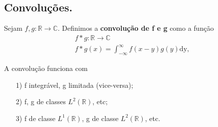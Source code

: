 \documentclass[../pde_notes.tex]{subfiles}
\begin{document}
\subsection{Convoluções.}
\begin{def*}
	Sejam \(f, g:\mathbb{R}\rightarrow \mathbb{C}\). Definimos a \textbf{convolução de f e g} como a função
	\begin{align*}
		 & f * g:  \mathbb{R}\rightarrow \mathbb{C}                  \\
		 & f * g(x) = \int_{-\infty}^{\infty}f(x-y)g(y) \mathrm{dy},
	\end{align*}
\end{def*}
\begin{tcolorbox}[
		skin=enhanced,
		title=Observação,
		fonttitle=\bfseries,
		colframe=black,
		colbacktitle=cyan!75!white,
		colback=cyan!15,
		colbacklower=black,
		coltitle=black,
		drop fuzzy shadow,
	]
	A convolução funciona com
	\begin{itemize}
		\item[1)] f integrável, g limitada (vice-versa);
		\item[2)] f, g de classes \(L^{2}(\mathbb{R})\), etc;
		\item[3)] f de classe \(L^{1}(\mathbb{R})\), g de classe \(L^{2}(\mathbb{R})\), etc.
	\end{itemize}
\end{tcolorbox}
\end{document}
